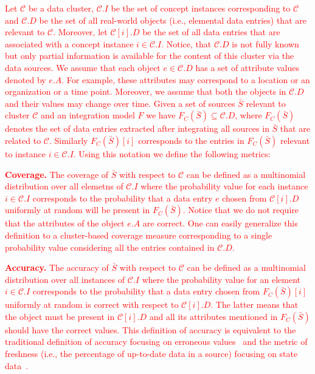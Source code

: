 \documentclass{sig-alternate}
\begin{document}
\textcolor{red}{Let $\mathcal{C}$  be a data cluster,  $\mathcal{C}.I$ be the set of concept instances corresponding to $\mathcal{C}$ and $\mathcal{C}.D$ be the set of all real-world objects (i.e., elemental data entries) that are relevant to $\mathcal{C}$. Moreover, let $\mathcal{C}[i].D$ be the set of all data entries that are associated with a concept instance $i \in \mathcal{C}.I$. Notice, that $\mathcal{C}.D$ is not fully known but only partial information is available for the content of this cluster via the data sources. We assume that each object $e \in \mathcal{C}.D$ has a set of attribute values denoted by $e.A$. For example, these attributes may correspond to a location or an organization or a time point. Moreover, we assume that both the objects in $\mathcal{C}.D$ and their values may change over time. Given a set of sources $\bar{S}$ relevant to cluster $\mathcal{C}$ and an integration model $F$ we have $F_C(\bar{S}) \subseteq \mathcal{C}.D$, where $F_C(\bar{S})$ denotes the set of data entries extracted after integrating all sources in $\bar{S}$ that are related to $\mathcal{C}$. Similarly $F_C(\bar{S})[i]$ corresponds to the entries in $F_C(\bar{S})$ relevant to instance $i \in \mathcal{C}.I$. Using this notation we define the following metrics:

\vspace{3pt}\noindent\textbf{Coverage.} The coverage of $\bar{S}$ with respect to $\mathcal{C}$ can be defined as a multinomial distribution over all elemetns of $\mathcal{C}.I$ where the probability value for each instance $i \in \mathcal{C}.I$ corresponds to the probability that a data entry $e$ chosen from $\mathcal{C}[i].D$ uniformly at random will be present in $F_C(\bar{S})$. Notice that we do not require that the attributes of the object $e.A$ are correct. One can easily generalize this definition to a cluster-based coverage measure corresponding to a single probability value considering all the entries contained in $\mathcal{C}.D$.

\vspace{3pt}\noindent\textbf{Accuracy.} The accuracy of $\bar{S}$ with respect to $\mathcal{C}$ can be defined as a multinomial distribution over all instances of $\mathcal{C}.I$ where the probability value for an element $i \in \mathcal{C}.I$ corresponds to the probability that a data entry chosen from $F_C(\bar{S})[i]$ uniformly at random is correct with respect to $\mathcal{C}[i].D$. The latter means that the object must be present in $\mathcal{C}[i].D$ and all its attributes mentioned in $F_C(\bar{S})$ should have the correct values. This definition of accuracy is equivalent to the traditional definition of accuracy focusing on erroneous values~\cite{dong:vldb13} and the metric of freshness (i.e., the percentage of up-to-date data in a source) focusing on state data~\cite{rekatsinas:2014}.}
\end{document}
